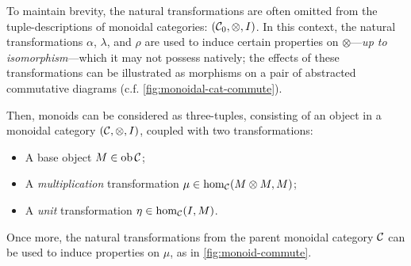 \documentclass[10pt,a4paper,reqno]{amsart}
\numberwithin{equation}{section}
\numberwithin{figure}{section}
\begin{document}
To maintain brevity, the natural transformations are often omitted from the
tuple-descriptions of monoidal categories: $(\mathcal{C}_0, \otimes, I)$. In this
context, the natural transformations $\alpha$, $\lambda$, and $\rho$ are used to
induce certain properties on $\otimes$---\emph{up to isomorphism}---which it
may not possess natively; the effects of these transformations can be
illustrated as morphisms on a pair of abstracted commutative diagrams (c.f.
\autoref{fig:monoidal-cat-commute}).

Then, monoids can be considered as three-tuples, consisting of an object in a
monoidal category $(\mathcal{C}, \otimes, I)$, coupled with two transformations:
\begin{itemize}
        \item A base object $M \in \operatorname{ob} \mathcal{C}$;
        \item A \emph{multiplication} transformation $\mu \in \hom_\mathcal{C}
        (M \otimes M, M)$;
        \item A \emph{unit} transformation $\eta \in \hom_\mathcal{C} (I, M)$.
\end{itemize}
Once more, the natural transformations from the parent monoidal category
$\mathcal{C}$ can be used to induce properties on $\mu$, as in
\autoref{fig:monoid-commute}.
\end{document}
